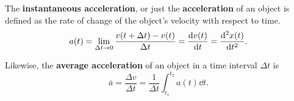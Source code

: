 \documentclass[../classical_mechanics.tex]{subfiles}
\begin{document}
            \begin{definition}
                The \textbf{instantaneous acceleration}, or just the \textbf{acceleration} of an object is defined as the rate of change of the object's velocity with respect to time.
                \begin{equation}
                    a(t)=\lim_{\Delta t\to0}\frac{v(t+\Delta t)-v(t)}{\Delta t}=\dv{v(t)}{t}=\dv[2]{x(t)}{t}.
                \end{equation}
            \end{definition}
            Likewise, the \textbf{average acceleration} of an object in a time interval $\Delta t$ is
            \begin{equation}\label{eq:average-acc}
                \bar{a}=\frac{\Delta v}{\Delta t}=\frac{1}{\Delta t}\int_{t_1}^{t_2}a(t)\dd{t}.
            \end{equation}
\end{document}
